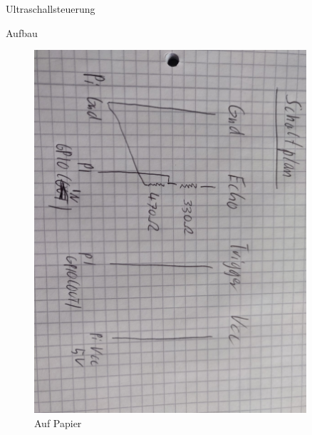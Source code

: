 \documentclass[12pt,twoside]{report}
\begin{document}
\begin{section}{Ultraschallsteuerung}
\begin{subsection}{Aufbau}
        \begin{figure}
            \centering
            \begin{minipage}{0.45\textwidth}
                \centering
                \includegraphics[width=0.9\textwidth]{lernportfolio_assets/Schaltplan_Ultraschallsensor1} %
                \caption{Auf Papier}
            \end{minipage}
            \hfill
            \begin{minipage}{0.45\textwidth}
                \centering

\end{minipage}
\end{figure}
\end{subsection}
\end{section}
\end{document}
